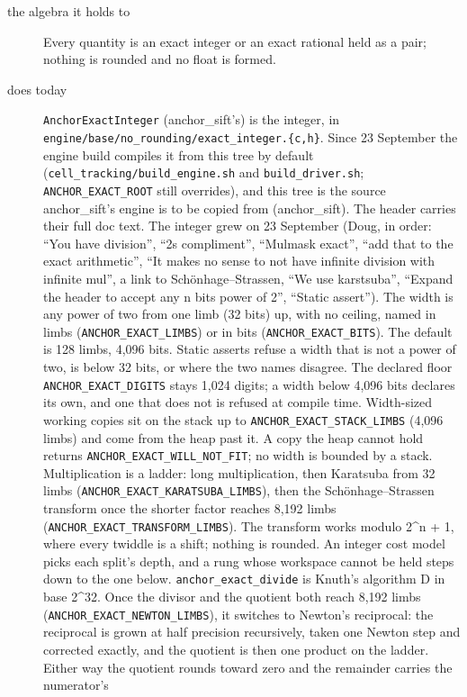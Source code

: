 \begin{description}
\item[{the algebra it holds to}] Every quantity is an exact integer or an exact rational held as a pair; nothing is rounded and no float is formed.
\item[{does today}] \texttt{Anchor\allowbreak{}Exact\allowbreak{}Integer} (anchor\_\allowbreak{}sift's) is the integer, in \texttt{engine/\allowbreak{}base/\allowbreak{}no\_\allowbreak{}rounding/\allowbreak{}exact\_\allowbreak{}integer.\allowbreak{}\{c,h\}}. Since 23 September the engine build compiles it from this tree by default (\texttt{cell\_\allowbreak{}tracking/\allowbreak{}build\_\allowbreak{}engine.\allowbreak{}sh} and \texttt{build\_\allowbreak{}driver.\allowbreak{}sh}; \texttt{ANCHOR\_\allowbreak{}EXACT\_\allowbreak{}ROOT} still overrides), and this tree is the source anchor\_\allowbreak{}sift's engine is to be copied from (anchor\_\allowbreak{}sift). The header carries their full doc text. The integer grew on 23 September (Doug, in order: “You have division”, “2s compliment”, “Mulmask exact”, “add that to the exact arithmetic”, “It makes no sense to not have infinite division with infinite mul”, a link to Schönhage–Strassen, “We use karstsuba”, “Expand the header to accept any n bits power of 2”, “Static assert”). The width is any power of two from one limb (32 bits) up, with no ceiling, named in limbs (\texttt{ANCHOR\_\allowbreak{}EXACT\_\allowbreak{}LIMBS}) or in bits (\texttt{ANCHOR\_\allowbreak{}EXACT\_\allowbreak{}BITS}). The default is 128 limbs, 4,096 bits. Static asserts refuse a width that is not a power of two, is below 32 bits, or where the two names disagree. The declared floor \texttt{ANCHOR\_\allowbreak{}EXACT\_\allowbreak{}DIGITS} stays 1,024 digits; a width below 4,096 bits declares its own, and one that does not is refused at compile time. Width-sized working copies sit on the stack up to \texttt{ANCHOR\_\allowbreak{}EXACT\_\allowbreak{}STACK\_\allowbreak{}LIMBS} (4,096 limbs) and come from the heap past it. A copy the heap cannot hold returns \texttt{ANCHOR\_\allowbreak{}EXACT\_\allowbreak{}WILL\_\allowbreak{}NOT\_\allowbreak{}FIT}; no width is bounded by a stack. Multiplication is a ladder: long multiplication, then Karatsuba from 32 limbs (\texttt{ANCHOR\_\allowbreak{}EXACT\_\allowbreak{}KARATSUBA\_\allowbreak{}LIMBS}), then the Schönhage–Strassen transform once the shorter factor reaches 8,192 limbs (\texttt{ANCHOR\_\allowbreak{}EXACT\_\allowbreak{}TRANSFORM\_\allowbreak{}LIMBS}). The transform works modulo 2\textasciicircum{}n + 1, where every twiddle is a shift; nothing is rounded. An integer cost model picks each split's depth, and a rung whose workspace cannot be held steps down to the one below. \texttt{anchor\_\allowbreak{}exact\_\allowbreak{}divide} is Knuth's algorithm D in base 2\textasciicircum{}32. Once the divisor and the quotient both reach 8,192 limbs (\texttt{ANCHOR\_\allowbreak{}EXACT\_\allowbreak{}NEWTON\_\allowbreak{}LIMBS}), it switches to Newton's reciprocal: the reciprocal is grown at half precision recursively, taken one Newton step and corrected exactly, and the quotient is then one product on the ladder. Either way the quotient rounds toward zero and the remainder carries the numerator's 
\end{description}
